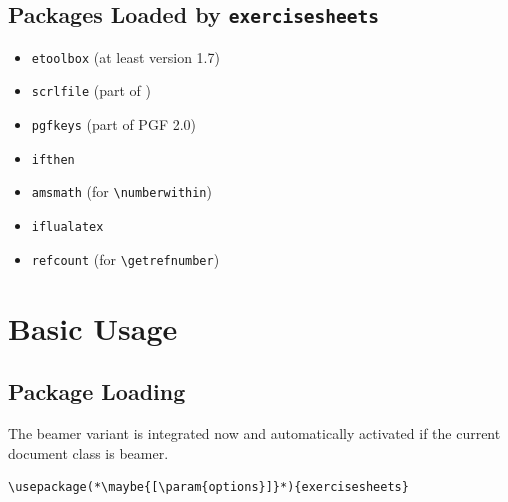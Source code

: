\documentclass[DIV12,BCOR0mm]{scrartcl}
\newcommand{\exsh}{\texttt{exercisesheets}\xspace}
\newcommand{\param}[1]{$\langle${\normalfont\itshape #1\/}$\rangle$}
\newcommand{\maybe}[1]{\textcolor{green!50!black}{#1}}
\begin{document}
\subsection{Packages Loaded by \exsh}
\begin{itemize}
 \item \texttt{etoolbox} (at least version
  1.7)
 \item \texttt{scrlfile} (part of \KOMAScript{})
 \item \texttt{pgfkeys} (part of PGF 2.0)
 \item \texttt{ifthen}
 \item \texttt{amsmath} (for \lstinline|\numberwithin|)
 \item \texttt{iflualatex}
 \item \texttt{refcount} (for \lstinline|\getrefnumber|)
\end{itemize}


\section{Basic Usage}

\subsection{Package Loading}
The beamer variant is integrated now and automatically activated
if the current document class is beamer.

\begin{lstlisting}
\usepackage(*\maybe{[\param{options}]}*){exercisesheets}
\end{lstlisting}
\end{document}
